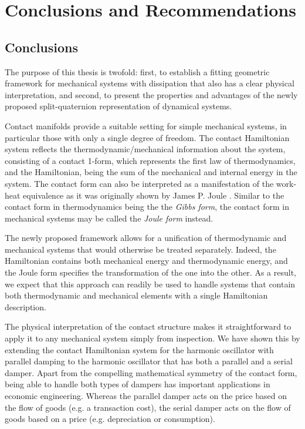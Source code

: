 \chapter{Conclusions and Recommendations}
\label{chap:conclusion}

\section*{Conclusions}
The purpose of this thesis is twofold: first, to establish a fitting geometric framework for mechanical systems with dissipation that also has a clear physical interpretation, and second, to present the properties and advantages of the newly proposed split-quaternion representation of dynamical systems. 

Contact manifolds provide a suitable setting for simple mechanical systems, in particular those with only a single degree of freedom. The contact Hamiltonian system reflects the thermodynamic/mechanical information about the system, consisting of a contact 1-form, which represents the first law of thermodynamics, and the Hamiltonian, being the sum of the mechanical and internal energy in the system. The contact form can also be interpreted as a manifestation of the work-heat equivalence as it was originally shown by James P. Joule \cite{joule1850}. Similar to the contact form in thermodynamics being the the \emph{Gibbs form}, the contact form in mechanical systems may be called the \emph{Joule form} instead. 

The newly proposed framework allows for a unification of thermodynamic and mechanical systems that would otherwise be treated separately. Indeed, the Hamiltonian contains both mechanical energy and thermodynamic energy, and the Joule form specifies the transformation of the one into the other. As a result, we expect that this approach can readily be used to handle systems that contain both thermodynamic and mechanical elements with a single Hamiltonian description.

The physical interpretation of the contact structure makes it straightforward to apply it to any mechanical system simply from inspection. We have shown this by extending the contact Hamiltonian system for the harmonic oscillator with parallel damping to the harmonic oscillator that has both a parallel and a serial damper. Apart from the compelling mathematical symmetry of the contact form, being able to handle both types of dampers has important applications in economic engineering. Whereas the parallel damper acts on the price based on the flow of goods (e.g. a transaction cost), the serial damper acts on the flow of goods based on a price (e.g. depreciation or consumption).

